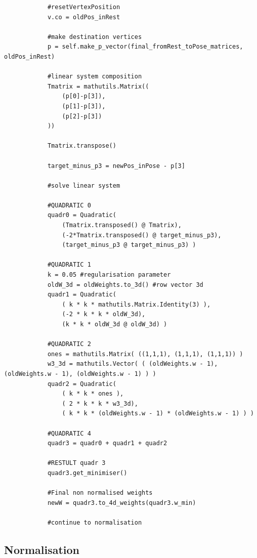 \documentclass[12pt,twoside]{report}
\begin{document}
\begin{lstlisting}
            #resetVertexPosition
            v.co = oldPos_inRest
            
            #make destination vertices
            p = self.make_p_vector(final_fromRest_toPose_matrices, oldPos_inRest)
            
            #linear system composition
            Tmatrix = mathutils.Matrix((
                (p[0]-p[3]),
                (p[1]-p[3]),
                (p[2]-p[3])
            ))
            
            Tmatrix.transpose()
            
            target_minus_p3 = newPos_inPose - p[3]
            
            #solve linear system
            
            #QUADRATIC 0
            quadr0 = Quadratic(
                (Tmatrix.transposed() @ Tmatrix),
                (-2*Tmatrix.transposed() @ target_minus_p3),
                (target_minus_p3 @ target_minus_p3) )
            
            #QUADRATIC 1
            k = 0.05 #regularisation parameter
            oldW_3d = oldWeights.to_3d() #row vector 3d
            quadr1 = Quadratic(
                ( k * k * mathutils.Matrix.Identity(3) ),
                (-2 * k * k * oldW_3d),
                (k * k * oldW_3d @ oldW_3d) )
            
            #QUADRATIC 2
            ones = mathutils.Matrix( ((1,1,1), (1,1,1), (1,1,1)) )
            w3_3d = mathutils.Vector( ( (oldWeights.w - 1), (oldWeights.w - 1), (oldWeights.w - 1) ) )
            quadr2 = Quadratic(
                ( k * k * ones ),
                ( 2 * k * k * w3_3d),
                ( k * k * (oldWeights.w - 1) * (oldWeights.w - 1) ) )

            #QUADRATIC 4
            quadr3 = quadr0 + quadr1 + quadr2
            
            #RESTULT quadr 3
            quadr3.get_minimiser()
            
            #Final non normalised weights
            newW = quadr3.to_4d_weights(quadr3.w_min)
            
            #continue to normalisation
\end{lstlisting}

\subsection{Normalisation}
\label{sec:normalise_implem}
\end{document}
